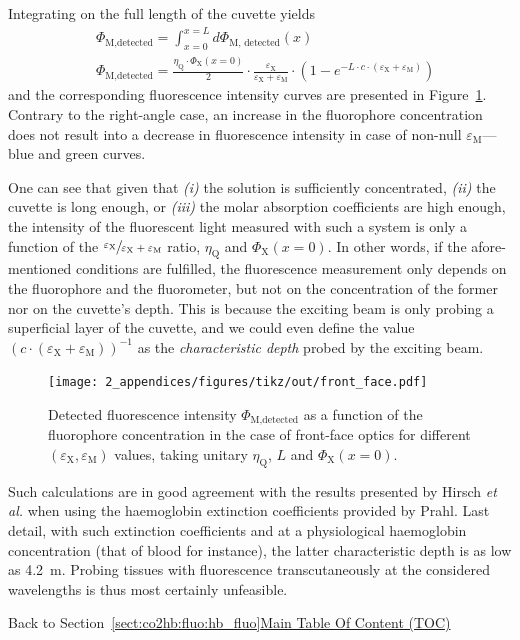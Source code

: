 Integrating on the full length of the cuvette yields
\begin{equation}
	\begin{split}
		&\Phi_\text{M,detected} = \int_{x=0}^{x=L} d\Phi_\text{M, detected}(x) \\
		&\Phi_\text{M,detected} = \frac{\eta_\text{Q} \cdot \Phi_\text{X}(x=0)}{2} \cdot \frac{\varepsilon_\text{X} }{\varepsilon_\text{X} + \varepsilon_\text{M}} \cdot (1-e^{-L\cdot c \cdot (\varepsilon_\text{X} + \varepsilon_\text{M})})
	\end{split}
\end{equation}
and the corresponding fluorescence intensity curves are presented in Figure~\ref{annfig:fluo_quenching:fluo_front_curves}. Contrary to the right-angle case, an increase in the fluorophore concentration does not result into a decrease in fluorescence intensity in case of non-null $\varepsilon_\text{M}$---blue and green curves.

One can see that given that \emph{(i)} the solution is sufficiently concentrated, \emph{(ii)} the cuvette is long enough, or \emph{(iii)} the molar absorption coefficients are high enough, the intensity of the fluorescent light measured with such a system is only a function of the $\sfrac{\varepsilon_\text{X}}{\varepsilon_\text{X} + \varepsilon_\text{M}}$ ratio, $\eta_\text{Q}$ and $\Phi_\text{X}(x=0)$. In other words, if the afore-mentioned conditions are fulfilled, the fluorescence measurement only depends on the fluorophore and the fluorometer, but not on the concentration of the former nor on the cuvette's depth. This is because the exciting beam is only probing a superficial layer of the cuvette, and we could even define the value $(c\cdot(\varepsilon_\text{X} + \varepsilon_\text{M}))^{-1}$ as the \emph{characteristic depth} probed by the exciting beam.

\begin{figure}
	\centering
	\texttt{[image: 2\_appendices/figures/tikz/out/front\_face.pdf]}
	\caption[Detected fluorescence intensity in the front-face optics case.]{Detected fluorescence intensity $\Phi_\text{M,detected}$ as a function of the fluorophore concentration in the case of front-face optics for different $(\varepsilon_\text{X},\varepsilon_\text{M})$ values, taking unitary $\eta_\text{Q}$, $L$ and $\Phi_\text{X}(x=0)$.}
	\label{annfig:fluo_quenching:fluo_front_curves}
\end{figure}

Such calculations are in good agreement with the results presented by Hirsch \textit{et al.}\cite{hirsch1980} when using the haemoglobin extinction coefficients provided by Prahl\cite{prahl1998}. Last detail, with such extinction coefficients and at a physiological haemoglobin concentration (that of blood for instance), the latter characteristic depth is as low as 4.2~{\textmu}m. Probing tissues with fluorescence transcutaneously at the considered wavelengths is thus most certainly unfeasible.

\begin{appbox}
	Back to Section~\ref{sect:co2hb:fluo:hb_fluo}\hfill \hyperref[chapter:toc]{Main Table Of Content (TOC)}
\end{appbox}
